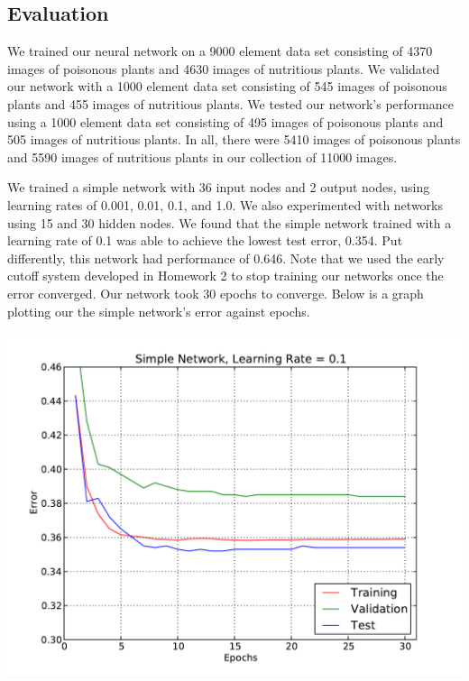 \documentclass[solution, letterpaper]{cs121}
\begin{document}
\subsection{Evaluation}
\hspace{4mm} We trained our neural network on a 9000 element data set consisting of 4370 images of poisonous plants and 4630 images of nutritious plants. We validated our network with a 1000 element data set consisting of 545 images of poisonous plants and 455 images of nutritious plants. We tested our network's performance using a 1000 element data set consisting of 495 images of poisonous plants and 505 images of nutritious plants. In all, there were 5410 images of poisonous plants and 5590 images of nutritious plants in our collection of 11000 images.

We trained a simple network with 36 input nodes and 2 output nodes, using learning rates of 0.001, 0.01, 0.1, and 1.0. We also experimented with networks using 15 and 30 hidden nodes. We found that the simple network trained with a learning rate of 0.1 was able to achieve the lowest test error, 0.354. Put differently, this network had performance of 0.646. Note that we used the early cutoff system developed in Homework 2 to stop training our networks once the error converged. Our network took 30 epochs to converge. Below is a graph plotting our the simple network's error against epochs.
\begin{center}
\includegraphics[scale=0.8]{source/simple-network-alpha-0_1.pdf}
\end{center}
\end{document}
